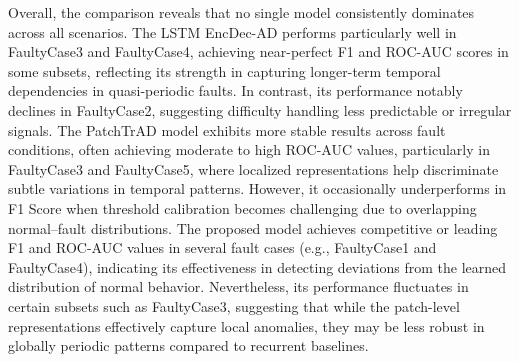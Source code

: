 \documentclass{article}
\begin{document}
Overall, the comparison reveals that no single model consistently dominates across all scenarios. The LSTM EncDec-AD performs particularly well in FaultyCase3 and FaultyCase4, achieving near-perfect F1 and ROC-AUC scores in some subsets, reflecting its strength in capturing longer-term temporal dependencies in quasi-periodic faults. In contrast, its performance notably declines in FaultyCase2, suggesting difficulty handling less predictable or irregular signals.
The PatchTrAD model exhibits more stable results across fault conditions, often achieving moderate to high ROC-AUC values, particularly in FaultyCase3 and FaultyCase5, where localized representations help discriminate subtle variations in temporal patterns. However, it occasionally underperforms in F1 Score when threshold calibration becomes challenging due to overlapping normal–fault distributions.
The proposed model achieves competitive or leading F1 and ROC-AUC values in several fault cases (e.g., FaultyCase1 and FaultyCase4), indicating its effectiveness in detecting deviations from the learned distribution of normal behavior. Nevertheless, its performance fluctuates in certain subsets such as FaultyCase3, suggesting that while the patch-level representations effectively capture local anomalies, they may be less robust in globally periodic patterns compared to recurrent baselines.
\end{document}
